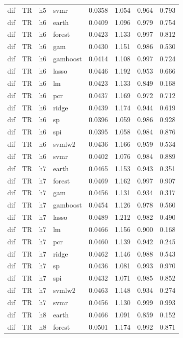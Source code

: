 \begin{ThreePartTable}
\begin{longtable}[t]{llclcccc}
dif & TR & h5 & svmr & 0.0358 & 1.054 & 0.964 & 0.793\\
\addlinespace
dif & TR & h6 & earth & 0.0409 & 1.096 & 0.979 & 0.754\\
dif & TR & h6 & forest & 0.0423 & 1.133 & 0.997 & 0.812\\
dif & TR & h6 & gam & 0.0430 & 1.151 & 0.986 & 0.530\\
dif & TR & h6 & gamboost & 0.0414 & 1.108 & 0.997 & 0.724\\
dif & TR & h6 & lasso & 0.0446 & 1.192 & 0.953 & 0.666\\
dif & TR & h6 & lm & 0.0423 & 1.133 & 0.849 & 0.168\\
dif & TR & h6 & pcr & 0.0437 & 1.169 & 0.972 & 0.712\\
dif & TR & h6 & ridge & 0.0439 & 1.174 & 0.944 & 0.619\\
dif & TR & h6 & sp & 0.0396 & 1.059 & 0.986 & 0.928\\
dif & TR & h6 & spi & 0.0395 & 1.058 & 0.984 & 0.876\\
dif & TR & h6 & svmlw2 & 0.0436 & 1.166 & 0.959 & 0.534\\
dif & TR & h6 & svmr & 0.0402 & 1.076 & 0.984 & 0.889\\
\addlinespace
dif & TR & h7 & earth & 0.0465 & 1.153 & 0.943 & 0.351\\
dif & TR & h7 & forest & 0.0469 & 1.162 & 0.997 & 0.907\\
dif & TR & h7 & gam & 0.0456 & 1.131 & 0.934 & 0.317\\
dif & TR & h7 & gamboost & 0.0454 & 1.126 & 0.978 & 0.560\\
dif & TR & h7 & lasso & 0.0489 & 1.212 & 0.982 & 0.490\\
dif & TR & h7 & lm & 0.0466 & 1.156 & 0.900 & 0.168\\
dif & TR & h7 & pcr & 0.0460 & 1.139 & 0.942 & 0.245\\
dif & TR & h7 & ridge & 0.0462 & 1.146 & 0.988 & 0.543\\
dif & TR & h7 & sp & 0.0436 & 1.081 & 0.993 & 0.970\\
dif & TR & h7 & spi & 0.0432 & 1.071 & 0.985 & 0.852\\
dif & TR & h7 & svmlw2 & 0.0463 & 1.148 & 0.934 & 0.274\\
dif & TR & h7 & svmr & 0.0456 & 1.130 & 0.999 & 0.993\\
\addlinespace
dif & TR & h8 & earth & 0.0466 & 1.091 & 0.859 & 0.152\\
dif & TR & h8 & forest & 0.0501 & 1.174 & 0.992 & 0.871\\

\end{longtable}
\end{ThreePartTable}
